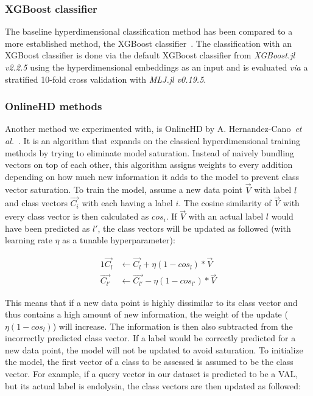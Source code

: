 \subsubsection*{XGBoost classifier}
The baseline hyperdimensional classification method has been compared to a more established method, the XGBoost classifier~\cite{xgboost}. The classification with an XGBoost classifier is done via the default XGBoost classifier from \textit{XGBoost.jl v2.2.5} using the hyperdimensional embeddings as an input and is evaluated \textit{via} a stratified 10-fold cross validation with \textit{MLJ.jl v0.19.5}.
\subsubsection*{OnlineHD methods}
Another method we experimented with, is OnlineHD by A. Hernandez-Cano~\textit{et al.}~\cite{onlinehd}. It is an algorithm that expands on the classical hyperdimensional training methods by trying to eliminate model saturation. Instead of naively bundling vectors on top of each other, this algorithm assigns weights to every addition depending on how much new information it adds to the model to prevent class vector saturation. To train the model, assume a new data point $\vec{V}$ with label $l$ and class vectors $\vec{C_{i}}$ with each having a label $i$. The cosine similarity of $\vec{V}$ with every class vector is then calculated as $cos_{i}$. If $\vec{V}$ with an actual label $l$ would have been predicted as $l'$, the class vectors will be updated as followed (with learning rate $\eta$ as a tunable hyperparameter):

\begin{alignat}{1}
    \label{eqn:onlinehd}
    \vec{C_{l}} &\leftarrow \vec{C_{l}} + \eta (1 - cos_{l}) * \vec{V} \\
    \vec{C_{l'}} &\leftarrow \vec{C_{l'}} - \eta (1 - cos_{l'}) * \vec{V}
\end{alignat}

This means that if a new data point is highly dissimilar to its class vector and thus contains a high amount of new information, the weight of the update ($\eta (1 - cos_{l})$) will increase. The information is then also subtracted from the incorrectly predicted class vector. If a label would be correctly predicted for a new data point, the model will not be updated to avoid saturation. To initialize the model, the first vector of a class to be assessed is assumed to be the class vector. For example, if a query vector in our dataset is predicted to be a VAL, but its actual label is endolysin, the class vectors are then updated as followed:

